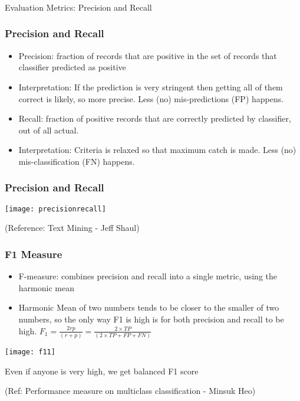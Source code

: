 \begin{frame}[fragile]\frametitle{}
\begin{center}
{\Large Evaluation Metrics: Precision and Recall}
\end{center}
\end{frame}

\begin{frame}[fragile]\frametitle{Precision and Recall}
\begin{itemize}
\item Precision: fraction of records that are positive in the set of records that classifier predicted as positive
\item Interpretation: If the prediction is very stringent then getting all of them correct is likely, so more precise. Less (no) mis-predictions (FP) happens.
 \item Recall: fraction of positive records that are correctly predicted by classifier, out of all actual.
\item Interpretation: Criteria is relaxed so that maximum catch is  made. Less (no) mis-classification (FN) happens.
\end{itemize}
\end{frame}



\begin{frame}[fragile]\frametitle{Precision and Recall}
\begin{center}
\texttt{[image: precisionrecall]}
\end{center}
\tiny{(Reference: Text Mining - Jeff Shaul)}

\end{frame}


\begin{frame}[fragile]\frametitle{F1 Measure}
\begin{itemize}
\item F-measure: combines precision and recall into a single metric, using the harmonic mean
\item Harmonic Mean of two numbers tends to be closer to the smaller of two numbers, so the only way F1 is high is for both precision and recall to be high.
 $F_1=\frac{2rp}{(r+p)}=\frac{2 \times TP}{(2 \times TP + FP + FN)}$
\end{itemize}

\begin{center}
\texttt{[image: f11]}
\end{center}

Even if anyone is very high, we get balanced F1 score

\tiny{(Ref: Performance measure on multiclass classification - Minsuk Heo)}


\end{frame}

